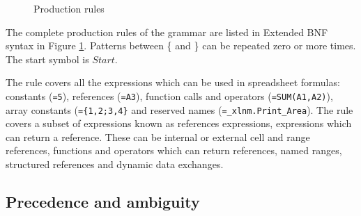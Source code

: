 \begin{figure}
\small
\begin{multicols*}{2}

\end{multicols*}
\caption{Production rules}
\label{figure:productions}
\end{figure}

The complete production rules of the grammar are listed in Extended BNF syntax in Figure \ref{figure:productions}.
Patterns between \{ and \} can be repeated zero or more times.
The start symbol is $Start$.

The  rule covers all the expressions which can be used in spreadsheet formulas: constants (\texttt{=5}), references (\texttt{=A3}), function calls and operators (\texttt{=SUM(A1,A2)}), array constants (\texttt{=\{1,2;3,4\}} and reserved names (\texttt{=_xlnm.Print_Area}).
The  rule covers a subset of expressions known as references expressions, expressions which can return a reference.
These can be internal or external cell and range references, functions and operators which can return references, named ranges, structured references and dynamic data exchanges.

%	
%
%	

\subsection{Precedence and ambiguity}
\label{sec:ambiguity}

